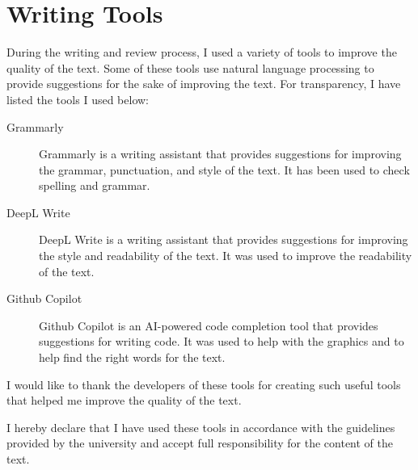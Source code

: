 \documentclass[../thesis.tex]{subfiles}
\begin{document}
    \chapter*{Writing Tools}
    During the writing and review process, I used a variety of tools to improve the quality of the text. Some of these tools use natural language processing to provide suggestions for the sake of improving the text. For transparency, I have listed the tools I used below:
    \begin{description}
        \item[Grammarly] Grammarly is a writing assistant that provides suggestions for improving the grammar, punctuation, and style of the text. It has been used to check spelling and grammar.
        \item[DeepL Write] DeepL Write is a writing assistant that provides suggestions for improving the style and readability of the text. It was used to improve the readability of the text.
        \item[Github Copilot] Github Copilot is an AI-powered code completion tool that provides suggestions for writing code. It was used to help with the graphics and to help find the right words for the text.
    \end{description}

    I would like to thank the developers of these tools for creating such useful tools that helped me improve the quality of the text.

    I hereby declare that I have used these tools in accordance with the guidelines provided by the university and accept full responsibility for the content of the text.

    \ifSubfilesClassLoaded{%
        \printbibliography{}%
    }{}
\end{document}
